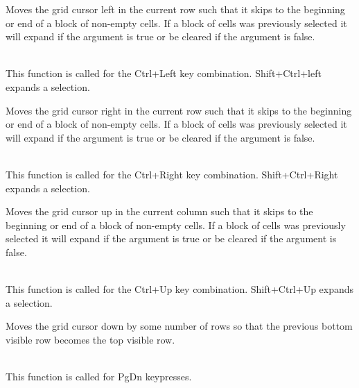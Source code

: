 \label{wxgridmovecursorleftblock}


Moves the grid cursor left in the current row such that it skips to the beginning or
end of a block of non-empty cells. If a block of cells was previously selected it
will expand if the argument is true or be cleared if the argument is false.

\\
This function is called for the Ctrl+Left key combination. Shift+Ctrl+left expands a selection.



\label{wxgridmovecursorrightblock}


Moves the grid cursor right in the current row such that it skips to the beginning or
end of a block of non-empty cells. If a block of cells was previously selected it
will expand if the argument is true or be cleared if the argument is false.

\\
This function is called for the Ctrl+Right key combination. Shift+Ctrl+Right expands a selection.



\label{wxgridmovecursorupblock}


Moves the grid cursor up in the current column such that it skips to the beginning or
end of a block of non-empty cells. If a block of cells was previously selected it
will expand if the argument is true or be cleared if the argument is false.

\\
This function is called for the Ctrl+Up key combination. Shift+Ctrl+Up expands a selection.



\label{wxgridmovepagedown}


Moves the grid cursor down by some number of rows so that the previous bottom visible row
becomes the top visible row.

\\
This function is called for PgDn keypresses.



